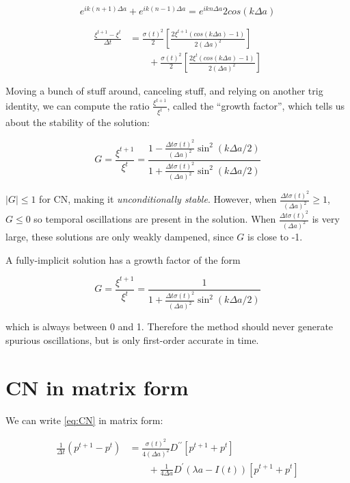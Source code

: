 \documentclass[12pt]{article}
\newcommand{\be}{\begin{equation}}
\newcommand{\ee}{\end{equation}}
\begin{document}
\be
	e^{ik(n+1)\Delta a} + e^{ik(n-1)\Delta a} = e^{ikn\Delta a}2cos(k\Delta a)
\ee

\begin{align} 
\frac{\xi^{t+1} - \xi^t}{\Delta t} &= \frac{\sigma(t)^2}{2} \left[ \frac{2\xi^{t+1} \left( cos(k\Delta a) - 1\right)}{2{\left(\Delta a\right)}^2} \right] \nonumber \\ 
	&\qquad {} + \frac{\sigma(t)^2}{2} \left[ \frac{2\xi^{t} \left( cos(k\Delta a) - 1\right)}{2{\left(\Delta a\right)}^2} \right]
\end{align}

Moving a bunch of stuff around, canceling stuff, and relying on another trig identity, we can compute the ratio $\frac{\xi^{t+1}}{\xi^{t}}$, called the ``growth factor'', which tells us about the stability of the solution:

\be
G = \frac{\xi^{t+1}}{\xi^{t}} = \frac{1 - \frac{\Delta t \sigma(t)^2}{{(\Delta a)}^2}\sin^2(k\Delta a/2)}{1 + \frac{\Delta t \sigma(t)^2}{{(\Delta a)}^2}\sin^2(k\Delta a/2)}
\ee

$|G| \leq 1$ for CN, making it \emph{unconditionally stable}. However, when $\frac{\Delta t \sigma(t)^2}{{(\Delta a)}^2} \geq 1$, $G \leq 0$ so temporal oscillations are present in the solution. When $\frac{\Delta t \sigma(t)^2}{{(\Delta a)}^2} $ is very large, these solutions are only weakly dampened, since $G$ is close to -1.

A fully-implicit solution has a growth factor of the form

\be
G = \frac{\xi^{t+1}}{\xi^{t}} = \frac{1}{1 + \frac{\Delta t \sigma(t)^2}{{(\Delta a)}^2}\sin^2(k\Delta a/2)}
\ee

which is always between 0 and 1. Therefore the method should never generate spurious oscillations, but is only first-order accurate in time. 

\section{CN in matrix form}

We can write \ref{eq:CN} in matrix form:

\begin{align}
	\frac{1}{\Delta t} \left(p^{t+1} - p^{t}\right) &= \frac{\sigma(t)^2}{4{{\left(\Delta a\right)}^2}} D^{\prime \prime} \left[ p^{t+1} + p^{t} \right]  \nonumber \\
	&\qquad {} + \frac{1}{4 \Delta a} D^{\prime}  \left(\lambda a - I(t) \right) \left[ p^{t+1} + p^{t} \right]	
\end{align}
\end{document}
